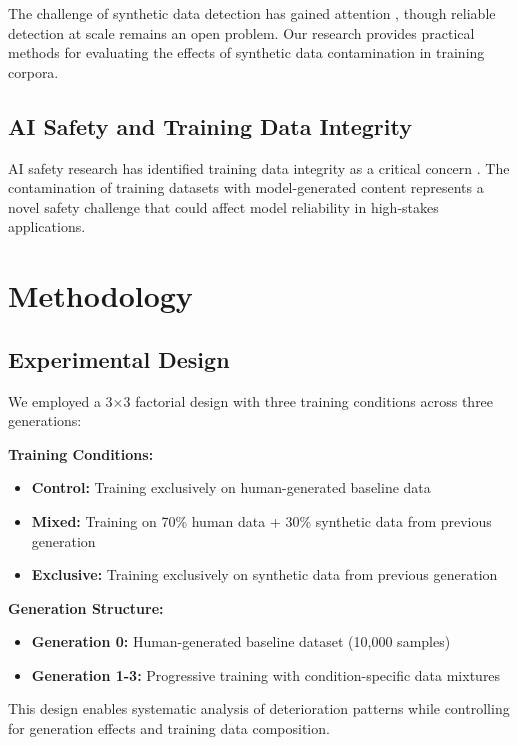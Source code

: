 \documentclass{article}
\begin{document}
The challenge of synthetic data detection has gained attention \citep{solaiman2019release,jawahar2020automatic}, though reliable detection at scale remains an open problem. Our research provides practical methods for evaluating the effects of synthetic data contamination in training corpora.

\subsection{AI Safety and Training Data Integrity}

AI safety research has identified training data integrity as a critical concern \citep{amodei2016concrete,russell2019human}. The contamination of training datasets with model-generated content represents a novel safety challenge that could affect model reliability in high-stakes applications.

\section{Methodology}

\subsection{Experimental Design}

We employed a 3×3 factorial design with three training conditions across three generations:

\textbf{Training Conditions:}
\begin{itemize}
\item \textbf{Control:} Training exclusively on human-generated baseline data
\item \textbf{Mixed:} Training on 70\% human data + 30\% synthetic data from previous generation
\item \textbf{Exclusive:} Training exclusively on synthetic data from previous generation
\end{itemize}

\textbf{Generation Structure:}
\begin{itemize}
\item \textbf{Generation 0:} Human-generated baseline dataset (10,000 samples)
\item \textbf{Generation 1-3:} Progressive training with condition-specific data mixtures
\end{itemize}

This design enables systematic analysis of deterioration patterns while controlling for generation effects and training data composition.
\end{document}
